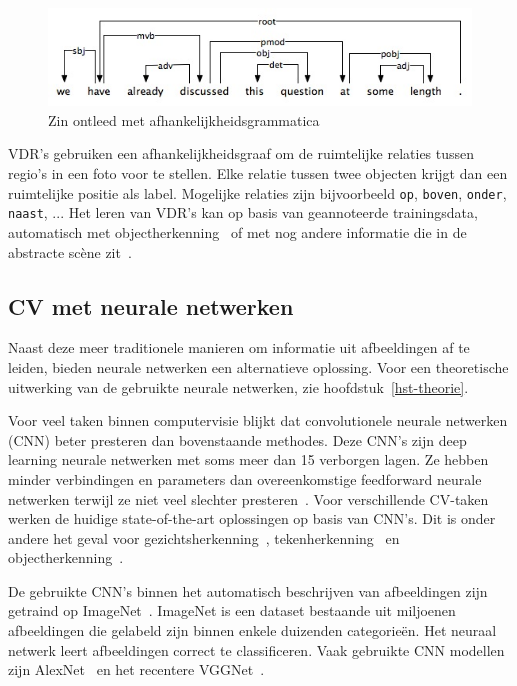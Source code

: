 \begin{figure}[tb]
	\centering
	\includegraphics[width=\linewidth]{Images/dependencygrammar.jpg}
    \caption{Zin ontleed met afhankelijkheidsgrammatica\cite{GasserNotes}}
	\label{fig:dep_grammar}
\end{figure}  

VDR's gebruiken een afhankelijkheidsgraaf om de ruimtelijke relaties tussen regio's in een foto voor te stellen. Elke relatie tussen twee objecten krijgt dan een ruimtelijke positie als label. Mogelijke relaties zijn bijvoorbeeld \texttt{op}, \texttt{boven}, \texttt{onder}, \texttt{naast}, ... Het leren van VDR's kan op basis van geannoteerde trainingsdata, automatisch met objectherkenning~\cite{Elliott2015} of met nog andere informatie die in de abstracte sc\`ene zit~\cite{Gilberto2015}.  


\subsection{CV met neurale netwerken}
Naast deze meer traditionele manieren om informatie uit afbeeldingen af te leiden, bieden neurale netwerken een alternatieve oplossing. Voor een theoretische uitwerking van de gebruikte neurale netwerken, zie hoofdstuk~\ref{hst-theorie}.

Voor veel taken binnen computervisie blijkt dat convolutionele neurale netwerken (CNN) beter presteren dan bovenstaande methodes. Deze CNN's zijn deep learning neurale netwerken met soms meer dan 15 verborgen lagen. Ze hebben minder verbindingen en parameters dan overeenkomstige feedforward neurale netwerken terwijl ze niet veel slechter presteren~\cite{Krizhevsky2012a}. 
Voor verschillende CV-taken werken de huidige state-of-the-art oplossingen op basis van CNN's. Dit is onder andere het geval voor gezichtsherkenning~\cite{Zhou2015}, tekenherkenning~\cite{Ciresan2012} en objectherkenning~\cite{Szegedy2014}.

De gebruikte CNN's binnen het automatisch beschrijven van afbeeldingen zijn getraind op ImageNet~\cite{Russakovsky2014}. ImageNet is een dataset bestaande uit miljoenen afbeeldingen die gelabeld zijn binnen enkele duizenden categorie\"en. Het neuraal netwerk leert afbeeldingen correct te classificeren. Vaak gebruikte CNN modellen zijn AlexNet~\cite{Krizhevsky2012a} en het recentere VGGNet~\cite{Arge2015}.

